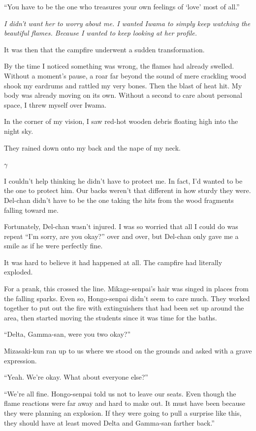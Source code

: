 \documentclass[
    a4paper,
    12pt,
    twoside,
    openany,
    UTF8,
    fontset=windows
]{ctexbook}
\begin{document}
``You have to be the one who treasures your own feelings of `love' most of all.''

\textit{I didn't want her to worry about me. I wanted Iwama to simply keep watching the beautiful flames. Because I wanted to keep looking at her profile.}

It was then that the campfire underwent a sudden transformation.

By the time I noticed something was wrong, the flames had already swelled. Without a moment's pause, a roar far beyond the sound of mere crackling wood shook my eardrums and rattled my very bones. Then the blast of heat hit. My body was already moving on its own. Without a second to care about personal space, I threw myself over Iwama.

In the corner of my vision, I saw red-hot wooden debris floating high into the night sky.

They rained down onto my back and the nape of my neck.

$\gamma$

I couldn't help thinking he didn't have to protect me. In fact, I'd wanted to be the one to protect him. Our backs weren't that different in how sturdy they were. Del-chan didn't have to be the one taking the hits from the wood fragments falling toward me.

Fortunately, Del-chan wasn't injured. I was so worried that all I could do was repeat ``I'm sorry, are you okay?'' over and over, but Del-chan only gave me a smile as if he were perfectly fine.

It was hard to believe it had happened at all. The campfire had literally exploded.

For a prank, this crossed the line. Mikage-senpai's hair was singed in places from the falling sparks. Even so, Hongo-senpai didn't seem to care much. They worked together to put out the fire with extinguishers that had been set up around the area, then started moving the students since it was time for the baths.

``Delta, Gamma-san, were you two okay?''

Mizasaki-kun ran up to us where we stood on the grounds and asked with a grave expression.

``Yeah. We're okay. What about everyone else?''

``We're all fine. Hongo-senpai told us not to leave our seats. Even though the flame reactions were far away and hard to make out. It must have been because they were planning an explosion. If they were going to pull a surprise like this, they should have at least moved Delta and Gamma-san farther back.''
\end{document}
